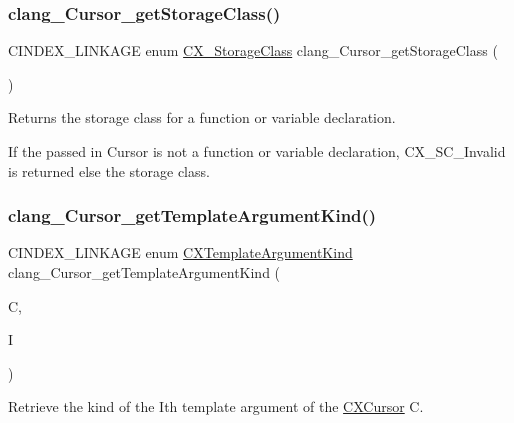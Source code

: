 \subsubsection{\texorpdfstring{clang\+\_\+\+Cursor\+\_\+get\+Storage\+Class()}{clang\_Cursor\_getStorageClass()}}
{\footnotesize\ttfamily C\+I\+N\+D\+E\+X\+\_\+\+L\+I\+N\+K\+A\+GE enum \mbox{\hyperlink{group__CINDEX__TYPES_ga03a15eaa53465d7f3ce7d88743241d7e}{C\+X\+\_\+\+Storage\+Class}} clang\+\_\+\+Cursor\+\_\+get\+Storage\+Class (\begin{DoxyParamCaption}\item[{\mbox{\hyperlink{structCXCursor}{C\+X\+Cursor}}}]{ }\end{DoxyParamCaption})}



Returns the storage class for a function or variable declaration. 

If the passed in Cursor is not a function or variable declaration, C\+X\+\_\+\+S\+C\+\_\+\+Invalid is returned else the storage class. \mbox{\label{group__CINDEX__TYPES_gad657c21f57e009899bd6a0ab618ee321}} 
\subsubsection{\texorpdfstring{clang\+\_\+\+Cursor\+\_\+get\+Template\+Argument\+Kind()}{clang\_Cursor\_getTemplateArgumentKind()}}
{\footnotesize\ttfamily C\+I\+N\+D\+E\+X\+\_\+\+L\+I\+N\+K\+A\+GE enum \mbox{\hyperlink{group__CINDEX__TYPES_gaf23c39e68c1fc756643583b43ee3e494}{C\+X\+Template\+Argument\+Kind}} clang\+\_\+\+Cursor\+\_\+get\+Template\+Argument\+Kind (\begin{DoxyParamCaption}\item[{\mbox{\hyperlink{structCXCursor}{C\+X\+Cursor}}}]{C,  }\item[{unsigned}]{I }\end{DoxyParamCaption})}



Retrieve the kind of the I\textquotesingle{}th template argument of the \mbox{\hyperlink{structCXCursor}{C\+X\+Cursor}} C. 

